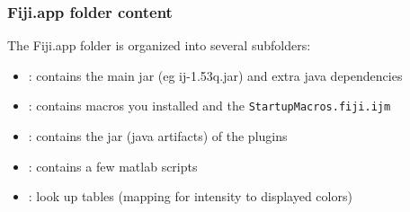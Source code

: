 \documentclass[ignorenonframetext,aspectratio=169,10pt,xcolor=table]{beamer}
\begin{document}
\begin{frame} \frametitle{Fiji.app folder content} The Fiji.app folder
  is organized into several subfolders:
  \begin{itemize}
  \item {} : contains the main jar (eg ij-1.53q.jar) and
    extra java dependencies
  \item {} : contains macros you installed and the
    \texttt{StartupMacros.fiji.ijm}
  \item {}: contains the jar (java artifacts) of the
    plugins
  \item {}: contains a few matlab scripts
  \item {} : look up tables (mapping for intensity to
    displayed colors)
  \end{itemize}
\end{frame}
\end{document}
